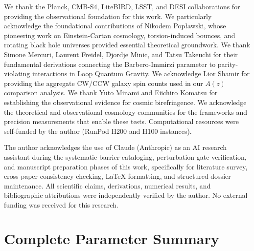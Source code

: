 \documentclass[aps,prd,twocolumn,superscriptaddress,showpacs,preprintnumbers,nofootinbib,longbibliography,floatfix]{revtex4-2}
\begin{document}
\begin{acknowledgments}
We thank the Planck, CMB-S4, LiteBIRD, LSST, and DESI collaborations for providing the observational foundation for this work. We particularly acknowledge the foundational contributions of Nikodem Pop\l{}awski, whose pioneering work on Einstein-Cartan cosmology, torsion-induced bounces, and rotating black hole universes provided essential theoretical groundwork. We thank Simone Mercuri, Laurent Freidel, Djordje Minic, and Tatsu Takeuchi for their fundamental derivations connecting the Barbero-Immirzi parameter to parity-violating interactions in Loop Quantum Gravity. We acknowledge Lior Shamir for providing the aggregate CW/CCW galaxy spin counts used in our $A(z)$ comparison analysis. We thank Yuto Minami and Eiichiro Komatsu for establishing the observational evidence for cosmic birefringence. We acknowledge the theoretical and observational cosmology communities for the frameworks and precision measurements that enable these tests. Computational resources were self-funded by the author (RunPod H200 and H100 instances).

The author acknowledges the use of Claude (Anthropic) as an AI research assistant during the systematic barrier-cataloging, perturbation-gate verification, and manuscript preparation phases of this work, specifically for literature survey, cross-paper consistency checking, LaTeX formatting, and structured-dossier maintenance. All scientific claims, derivations, numerical results, and bibliographic attributions were independently verified by the author. No external funding was received for this research.
\end{acknowledgments}


\appendix



\section{Complete Parameter Summary}\label{app:params}
\end{document}
